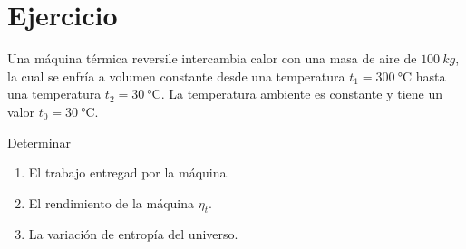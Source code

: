 \section{Ejercicio}\label{ej:Chap07Ejercicio19}
Una máquina térmica reversile intercambia calor con una masa de aire de $\SI{100}{kg}$, la cual se enfría a volumen constante desde una temperatura $t_1=\SI{300}{\celsius}$ hasta una temperatura $t_2=\SI{30}{\celsius}$. La temperatura ambiente es constante y tiene un valor $t_0=\SI{30}{\celsius}$.

Determinar
\begin{enumerate}
    \item El trabajo entregad por la máquina.
    \item El rendimiento de la máquina $\eta_t$.
    \item La variación de entropía del universo.
\end{enumerate}